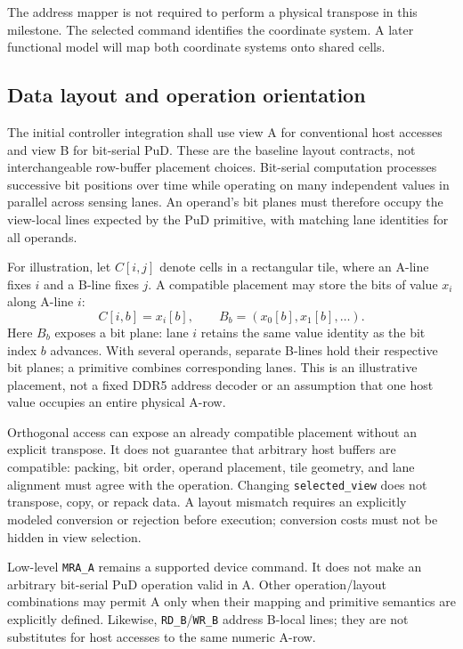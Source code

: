\documentclass[9pt,twocolumn]{extarticle}
\newcommand{\cmd}[1]{\texttt{#1}}
\newcommand{\viewA}{\textsf{A}}
\newcommand{\viewB}{\textsf{B}}
\begin{document}
The address mapper is not required to perform a physical transpose in this
milestone. The selected command identifies the coordinate system. A later
functional model will map both coordinate systems onto shared cells.

\subsection{Data layout and operation orientation}
\label{sec:layout}

The initial controller integration shall use view \viewA{} for conventional
host accesses and view \viewB{} for bit-serial PuD. These are the baseline
layout contracts, not interchangeable row-buffer placement choices.
Bit-serial computation processes successive bit positions over time while
operating on many independent values in parallel across sensing lanes.
An operand's bit planes must therefore occupy the view-local lines expected
by the PuD primitive, with matching lane identities for all operands.

For illustration, let $C[i,j]$ denote cells in a rectangular tile, where an
A-line fixes $i$ and a B-line fixes $j$. A compatible placement may store
the bits of value $x_i$ along A-line $i$:
\begin{equation*}
 C[i,b]=x_i[b],\qquad B_b=(x_0[b],x_1[b],\ldots).
\end{equation*}
Here $B_b$ exposes a bit plane: lane $i$ retains the same value identity as
the bit index $b$ advances. With several operands, separate B-lines hold
their respective bit planes; a primitive combines corresponding lanes.
This is an illustrative placement, not a fixed DDR5 address decoder or an
assumption that one host value occupies an entire physical A-row.

Orthogonal access can expose an already compatible placement without an
explicit transpose. It does not guarantee that arbitrary host buffers are
compatible: packing, bit order, operand placement, tile geometry, and lane
alignment must agree with the operation. Changing \cmd{selected\_view} does
not transpose, copy, or repack data. A layout mismatch requires an explicitly
modeled conversion or rejection before execution; conversion costs must not
be hidden in view selection.

Low-level \cmd{MRA\_A} remains a supported device command. It does not make
an arbitrary bit-serial PuD operation valid in A. Other operation/layout
combinations may permit A only when their mapping and primitive semantics
are explicitly defined. Likewise, \cmd{RD\_B}/\cmd{WR\_B} address B-local
lines; they are not substitutes for host accesses to the same numeric A-row.
\end{document}
